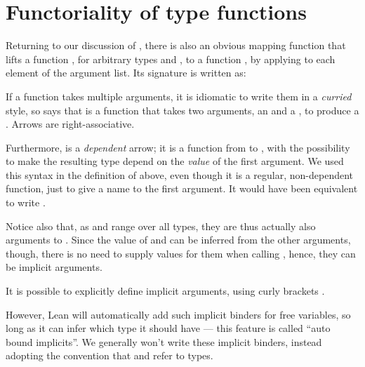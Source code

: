 \section{Functoriality of type functions}

Returning to our discussion of , there is also an obvious mapping function that lifts a function , for arbitrary types  and , to a function , by applying  to each element of the argument list. Its signature is written as:
\begin{center}
\end{center}

\begin{remark}
    If a function takes multiple arguments, it is idiomatic to write them in a \emph{curried} style,
    so  says that  is a function that takes two arguments, an  and a , to produce a . Arrows are right-associative.

    Furthermore,  is a \emph{dependent} arrow; it is a function from  to , with the possibility to make the resulting type depend on the \emph{value}  of the first argument. 
    We used this syntax in the definition of  above, even though it is a regular, non-dependent function, just to give a name to the first argument. 
    It would have been equivalent to write .

    Notice also that, as  and  range over all types, they are thus actually also arguments to . Since the value of  and  can be inferred from the other arguments, though, there is no need to supply values for them when calling , hence, they can be implicit arguments. 
    
    It is possible to explicitly define implicit arguments, using curly brackets .
    \begin{center}
    \end{center}
    However, Lean will automatically add such implicit binders for free variables, so long as it can infer which type it should have --- this feature is called ``auto bound implicits''. 
    We generally won't write these implicit binders, instead adopting the convention that  and  refer to types.
\end{remark}

